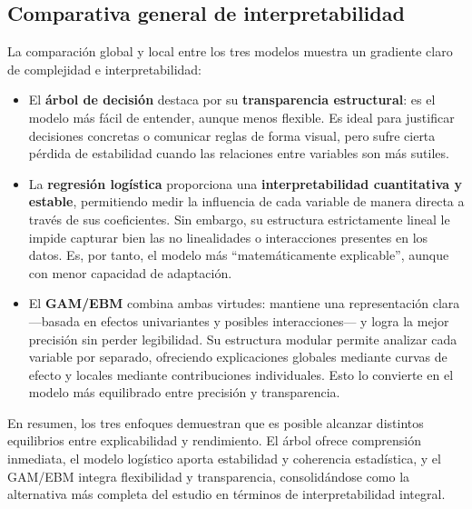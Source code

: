 \subsection{Comparativa general de interpretabilidad}

La comparación global y local entre los tres modelos muestra un gradiente claro de complejidad e interpretabilidad:

\begin{itemize}
  \item El \textbf{árbol de decisión} destaca por su \textbf{transparencia estructural}: es el modelo más fácil de entender, aunque menos flexible. Es ideal para justificar decisiones concretas o comunicar reglas de forma visual, pero sufre cierta pérdida de estabilidad cuando las relaciones entre variables son más sutiles.
  
  \item La \textbf{regresión logística} proporciona una \textbf{interpretabilidad cuantitativa y estable}, permitiendo medir la influencia de cada variable de manera directa a través de sus coeficientes. Sin embargo, su estructura estrictamente lineal le impide capturar bien las no linealidades o interacciones presentes en los datos. Es, por tanto, el modelo más “matemáticamente explicable”, aunque con menor capacidad de adaptación.
  
  \item El \textbf{GAM/EBM} combina ambas virtudes: mantiene una representación clara —basada en efectos univariantes y posibles interacciones— y logra la mejor precisión sin perder legibilidad. Su estructura modular permite analizar cada variable por separado, ofreciendo explicaciones globales mediante curvas de efecto y locales mediante contribuciones individuales. Esto lo convierte en el modelo más equilibrado entre precisión y transparencia.
\end{itemize}

En resumen, los tres enfoques demuestran que es posible alcanzar distintos equilibrios entre explicabilidad y rendimiento. 
El árbol ofrece comprensión inmediata, el modelo logístico aporta estabilidad y coherencia estadística, y el GAM/EBM integra flexibilidad y transparencia, consolidándose como la alternativa más completa del estudio en términos de interpretabilidad integral.

